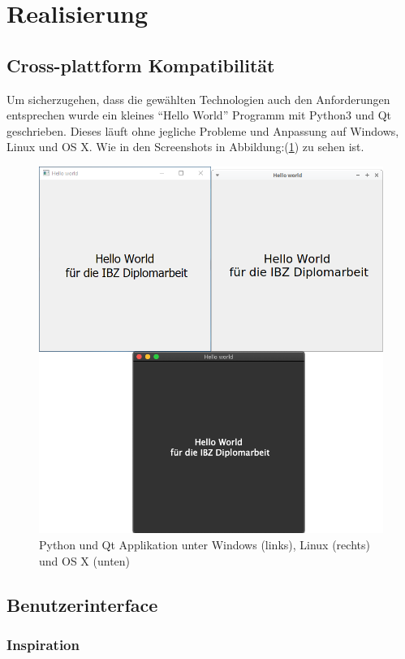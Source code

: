 \cleardoublepage
\section{Realisierung}
\label{sec:orgb833f22}
\subsection{Cross-plattform Kompatibilität}
\label{sec:orgcad6880}

Um sicherzugehen, dass die gewählten Technologien auch den Anforderungen
entsprechen wurde ein kleines "`Hello World"' Programm mit Python3 und Qt
geschrieben. Dieses läuft ohne jegliche Probleme und Anpassung auf Windows,
Linux und OS X. Wie in den Screenshots in Abbildung:(\ref{fig:org8f81d9f}) zu sehen
ist.

\begin{figure}[htbp]
\centering
\includegraphics[width=.9\linewidth]{pictures/hello_world.png}
\caption{\label{fig:org8f81d9f}
Python und Qt Applikation unter Windows (links), Linux (rechts) und OS X (unten)}
\end{figure}

\subsection{Benutzerinterface}
\label{sec:org184310c}
\subsubsection{Inspiration}
\label{sec:orge74a4b2}

